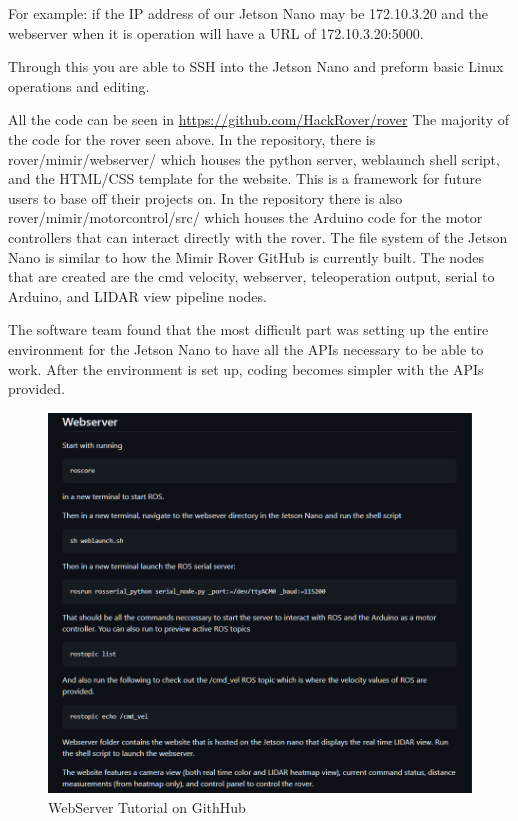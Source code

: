\documentclass[a4paper, 10pt]{article}
\begin{document}
    For example: if the IP address of our Jetson Nano may be 172.10.3.20 and the webserver when it is operation will have a URL of 172.10.3.20:5000.

    Through this you are able to SSH into the Jetson Nano and preform basic Linux operations and editing.
    
    All the code can be seen in \url{https://github.com/HackRover/rover}
    The majority of the code for the rover seen above. In the repository, there is rover/mimir/webserver/ which houses the python server, weblaunch shell script, and the HTML/CSS template for the website. This is a framework for future users to base off their projects on.
    In the repository there is also rover/mimir/motorcontrol/src/ which houses the Arduino code for the motor controllers that can interact directly with the rover.
    The file system of the Jetson Nano is similar to how the Mimir Rover GitHub is currently built. 
    The nodes that are created are the cmd velocity, webserver, teleoperation output, serial to Arduino, and LIDAR view pipeline nodes.

    The software team found that the most difficult part was setting up the entire environment for the Jetson Nano to have all the APIs necessary to be able to work. After the environment is set up, coding becomes simpler with the APIs provided. 

	\begin{figure} [!h]
			\centering
			\includegraphics[scale=0.5]{Photos/WebserverTut.png}
			\caption{WebServer Tutorial on GithHub}
			\label{webserver}
	\end{figure}
\end{document}
